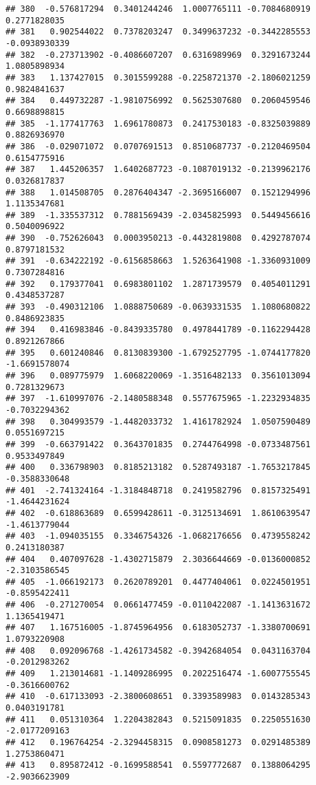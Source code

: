 \documentclass[
]{article}
\begin{document}
\begin{verbatim}
## 380  -0.576817294  0.3401244246  1.0007765111 -0.7084680919  0.2771828035
## 381   0.902544022  0.7378203247  0.3499637232 -0.3442285553 -0.0938930339
## 382  -0.273713902 -0.4086607207  0.6316989969  0.3291673244  1.0805898934
## 383   1.137427015  0.3015599288 -0.2258721370 -2.1806021259  0.9824841637
## 384   0.449732287 -1.9810756992  0.5625307680  0.2060459546  0.6698898815
## 385  -1.177417763  1.6961780873  0.2417530183 -0.8325039889  0.8826936970
## 386  -0.029071072  0.0707691513  0.8510687737 -0.2120469504  0.6154775916
## 387   1.445206357  1.6402687723 -0.1087019132 -0.2139962176  0.0326817837
## 388   1.014508705  0.2876404347 -2.3695166007  0.1521294996  1.1135347681
## 389  -1.335537312  0.7881569439 -2.0345825993  0.5449456616  0.5040096922
## 390  -0.752626043  0.0003950213 -0.4432819808  0.4292787074  0.8797181532
## 391  -0.634222192 -0.6156858663  1.5263641908 -1.3360931009  0.7307284816
## 392   0.179377041  0.6983801102  1.2871739579  0.4054011291  0.4348537287
## 393  -0.490312106  1.0888750689 -0.0639331535  1.1080680822  0.8486923835
## 394   0.416983846 -0.8439335780  0.4978441789 -0.1162294428  0.8921267866
## 395   0.601240846  0.8130839300 -1.6792527795 -1.0744177820 -1.6691578074
## 396   0.089775979  1.6068220069 -1.3516482133  0.3561013094  0.7281329673
## 397  -1.610997076 -2.1480588348  0.5577675965 -1.2232934835 -0.7032294362
## 398   0.304993579 -1.4482033732  1.4161782924  1.0507590489  0.0551697215
## 399  -0.663791422  0.3643701835  0.2744764998 -0.0733487561  0.9533497849
## 400   0.336798903  0.8185213182  0.5287493187 -1.7653217845 -0.3588330648
## 401  -2.741324164 -1.3184848718  0.2419582796  0.8157325491 -1.4644231624
## 402  -0.618863689  0.6599428611 -0.3125134691  1.8610639547 -1.4613779044
## 403  -1.094035155  0.3346754326 -1.0682176656  0.4739558242  0.2413180387
## 404   0.407097628 -1.4302715879  2.3036644669 -0.0136000852 -2.3103586545
## 405  -1.066192173  0.2620789201  0.4477404061  0.0224501951 -0.8595422411
## 406  -0.271270054  0.0661477459 -0.0110422087 -1.1413631672  1.1365419471
## 407   1.167516005 -1.8745964956  0.6183052737 -1.3380700691  1.0793220908
## 408   0.092096768 -1.4261734582 -0.3942684054  0.0431163704 -0.2012983262
## 409   1.213014681 -1.1409286995  0.2022516474 -1.6007755545 -0.3616600762
## 410  -0.617133093 -2.3800608651  0.3393589983  0.0143285343  0.0403191781
## 411   0.051310364  1.2204382843  0.5215091835  0.2250551630 -2.0177209163
## 412   0.196764254 -2.3294458315  0.0908581273  0.0291485389  1.2753860471
## 413   0.895872412 -0.1699588541  0.5597772687  0.1388064295 -2.9036623909

\end{verbatim}
\end{document}
